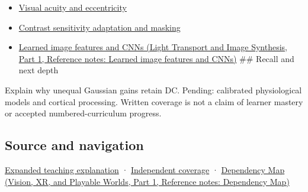 \hypertarget{appendix-7281c15ac44a-used-by}{}

\begin{itemize}
\item
  \hyperref[appendix-b491fc48c54b]{Visual acuity and eccentricity}
\item
  \hyperref[appendix-b3aa9e8e01ad]{Contrast sensitivity adaptation and masking}
\item
  \href{../04-Light-Transport-and-Image-Synthesis-P01/main.pdf\#appendix-47c51ea026fb}{Learned image features and CNNs (Light Transport and Image Synthesis, Part 1, Reference notes: Learned image features and CNNs)} \#\# Recall and next depth
\end{itemize}

Explain why unequal Gaussian gains retain DC. Pending: calibrated physiological models and cortical processing. Written coverage is not a claim of learner mastery or accepted numbered-curriculum progress.

\subsection{Source and navigation}\label{appendix-7281c15ac44a-source-and-navigation}

\hypertarget{appendix-7281c15ac44a-source-and-navigation}{}

\hyperref[04-visual-computing-ii-ch042-the-eye-is-an-optical-instrument-with-neural-processing-inside-it]{Expanded teaching explanation} · \hyperref[appendix-fd090d982a15-xr01---independent-seeing-and-representation-source]{Independent coverage} · \href{../07-Vision-XR-and-Playable-Worlds-P01/main.pdf\#appendix-4ad47bdd269a}{Dependency Map (Vision, XR, and Playable Worlds, Part 1, Reference notes: Dependency Map)}
